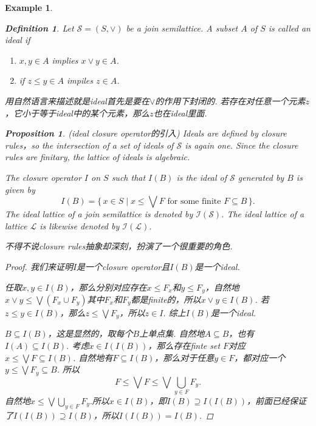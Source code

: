 \documentclass{article}
\newtheorem{proposition}[theorem]{Proposition}
\newtheorem{example}[theorem]{Example}
\newtheorem{definition}[theorem]{Definition}
\newcommand\Set[2]{\{\,#1\mid#2\,\}} %
\newcommand\SET[2]{\Set{#1}{\text{#2}}} %
\newcommand\slattice{\mathcal{S}}
\newcommand\lattice{\mathcal{L}}
\begin{document}
\begin{example}
\newpage 
\begin{definition}
\rm Let $\slattice = (S, \vee)$ be a join semilattice. A subset $A$ of $S$  is called an {\color{red} ideal} if
\begin{enumerate}
	\item $x,y \in A$ implies $x \vee y \in A$. 
	\item if $z \leq y \in A$ impiles $z \in A$.
\end{enumerate}

{\color{blue} 用自然语言来描述就是ideal首先是要在$\vee$的作用下封闭的. 若存在对任意一个元素$z$，它小于等于ideal中的某个元素，那么$z$也在ideal里面}.
\end{definition}

\begin{proposition}
\rm {\color{red}(ideal closure operator的引入)} Ideals are defined by closure rules，so the intersection of a set of ideals of $\slattice$ is again one. Since the closure rules are finitary, {\color{red} the lattice of ideals is algebraic}. 

The closure operator $I$ on $S$ such that $I(B)$ is the ideal of $\slattice$ generated by $B$ is given by
$$
I(B) = \SET{x \in S}{$x \leq \bigvee F$ for some finite $F \subseteq B$}.
$$
The ideal lattice of a join semilattice is denoted by $\mathcal{I}(\mathcal{S})$. The ideal lattice of a lattice $\lattice$ is likewise denoted by $\mathcal{I}(\lattice)$.    
\end{proposition}

{\color{blue} 不得不说closure rules抽象却深刻，扮演了一个很重要的角色}.

\begin{proof}
{\color{red} 我们来证明$I$是一个closure operator且$I(B)$是一个ideal}. 

任取$x,y \in I(B)$，那么分别对应存在$x \leq F_x$和$y \leq F_y$，自然地$x \vee y \leq \bigvee(F_x \cup F_y)$其中$F_x$和$F_y$都是finite的，所以$x \vee y \in I(B)$. 若$z \leq y \in I(B)$，那么$z \leq \bigvee F_y$，所以$z \in I$. 综上$I(B)$是一个ideal.  


$B \subseteq I(B)$，这是显然的，取每个$B$上单点集. 自然地$A \subseteq B$，也有$I(A) \subseteq I(B)$. 考虑$x \in I(I(B))$，那么存在finte set $F$对应$x \leq  \bigvee F \subseteq I(B)$. 自然地有$F \subseteq I(B)$，那么对于任意$y \in F$，都对应一个$ y \leq \bigvee F_y \subseteq B$. 所以
$$ 
F \leq \bigvee F \leq \bigvee \bigcup\limits_{y \in F} F_y.
$$
自然地$x \leq \bigvee \bigcup\limits_{y \in F} F_y.$所以$x \in I(B)$，即$I(B) \supseteq I(I(B))$，前面已经保证了$I(I(B)) \supseteq I(B)$，所以$I(I(B)) = I(B)$.


\end{proof}
\end{example}
\end{document}

